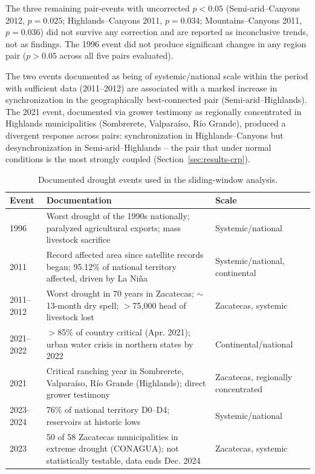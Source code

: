 \documentclass[climate,article,submit,moreauthors]{Definitions/mdpi}
\begin{document}
The three remaining pair-events with uncorrected $p<0.05$
(Semi-arid--Canyons 2012, $p=0.025$; Highlands--Canyons 2011, $p=0.034$;
Mountains--Canyons 2011, $p=0.036$) did not survive any correction and are
reported as inconclusive trends, not as findings. The 1996 event did not
produce significant changes in any region pair ($p>0.05$ across all five
pairs evaluated).

The two events documented as being of systemic/national scale within the
period with sufficient data (2011--2012) are associated with a marked
increase in synchronization in the geographically best-connected pair
(Semi-arid--Highlands). The 2021 event, documented via grower testimony as
regionally concentrated in Highlands municipalities (Sombrerete, Valparaíso,
Río Grande), produced a divergent response across pairs: synchronization in
Highlands--Canyons but desynchronization in Semi-arid--Highlands -- the pair
that under normal conditions is the most strongly coupled
(Section~\ref{sec:results-crp}).

\begin{table}[H]
\caption{Documented drought events used in the sliding-window analysis.}
\label{tab:droughtevents}
\begin{tabularx}{\linewidth}{lXl}
\toprule
\textbf{Event} & \textbf{Documentation} & \textbf{Scale} \\
\midrule
1996 & Worst drought of the 1990s nationally; paralyzed agricultural exports; mass livestock sacrifice \cite{TVAztecaSequias} & Systemic/national \\
2011 & Record affected area since satellite records began; 95.12\% of national territory affected, driven by La Ni\~na \cite{SMNsequia2026} & Systemic/national, continental \\
2011--2012 & Worst drought in 70 years in Zacatecas; $\sim$13-month dry spell; $>$75,000 head of livestock lost \cite{Scielo2016Sequia,Scielo2018Sequia,AliatConexxion2012} & Zacatecas, systemic \\
2021--2022 & $>$85\% of country critical (Apr. 2021); urban water crisis in northern states by 2022 \cite{SMNsequia2026} & Continental/national \\
2021 & Critical ranching year in Sombrerete, Valparaíso, R\'io Grande (Highlands); direct grower testimony & Zacatecas, regionally concentrated \\
2023--2024 & 76\% of national territory D0--D4; reservoirs at historic lows \cite{Informador2024Sequia,WikipediaEscasezHidrica,Ganaderia2024Sequia} & Systemic/national \\
2023 & 50 of 58 Zacatecas municipalities in extreme drought (CONAGUA); not statistically testable, data ends Dec. 2024 & Zacatecas, systemic \\
\bottomrule
\end{tabularx}
\end{table}
\end{document}

